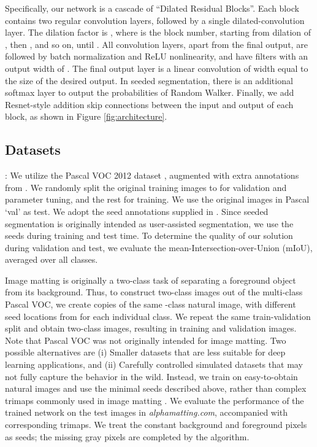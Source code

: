 \documentclass[journal]{IEEEtran}
\begin{document}
Specifically, our network is a cascade of ``Dilated Residual Blocks''. Each block contains two regular convolution layers, followed by a single dilated-convolution layer. The dilation factor is , where  is the block number, starting from dilation of , then , and so on, until . All convolution layers, apart from the final output, are followed by batch normalization and ReLU nonlinearity, and have  filters with an output width of . The final output layer is a linear  convolution of width equal to the size of the desired output. In seeded segmentation, there is an additional softmax layer to output the probabilities of Random Walker.
Finally, we add Resnet-style addition skip connections between the input and output of each block, as shown in Figure \ref{fig:architecture}. 



\subsection{Datasets} \label{ss:dataset}

:
We utilize the Pascal VOC 2012 dataset \cite{pascal}, augmented with extra annotations from \cite{pascal_aug}. We randomly split the original  training images to  for validation and parameter tuning, and the rest for training. We use the original  images in Pascal `val' as test. We adopt the seed annotations supplied in \cite{scribblesup}. Since seeded segmentation is originally intended as user-assisted segmentation, we use the seeds during training and test time. To determine the quality of our solution during validation and test, we evaluate the mean-Intersection-over-Union (mIoU), averaged over all  classes.

Image matting is originally a two-class task of separating a foreground object from its background. Thus, to construct two-class images out of the multi-class Pascal VOC, we create  copies of the same -class  natural image, with different seed locations from \cite{scribblesup} for each individual class. We repeat the same train-validation split and obtain two-class images, resulting in  training and  validation images.
Note that Pascal VOC was not originally intended for image matting. Two possible  alternatives are (i) Smaller datasets \cite{alpha_matting_com} that are less suitable for deep learning applications, and (ii) Carefully controlled simulated datasets \cite{deep_matting} that may not fully capture the behavior in the wild. Instead, we train on easy-to-obtain natural images and use the minimal seeds described above, rather than complex trimaps commonly used in image matting \cite{alpha_matting_com,deep_matting}. We evaluate the performance of the trained network on the  test images in \textit{alphamatting.com}, accompanied with corresponding trimaps. We treat the constant background and foreground pixels as seeds; the missing gray pixels are completed by the algorithm. 
\end{document}
